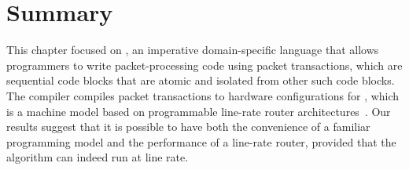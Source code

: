\section{Summary}
\label{s:domino_summary}

This chapter focused on \pktlanguage, an imperative domain-specific language
that allows programmers to write packet-processing code using packet
transactions, which are sequential code blocks that are atomic and isolated
from other such code blocks. The \pktlanguage compiler compiles packet
transactions to hardware configurations for \absmachine, which is a machine
model based on programmable line-rate router architectures~\cite{flexpipe,
xpliant, tofino}. Our results suggest that it is possible to have both the
convenience of a familiar programming model and the performance of a line-rate
router, provided that the algorithm can indeed run at line rate.
